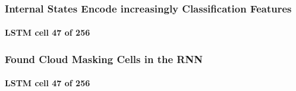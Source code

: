 
\begin{frame}
\frametitle{Internal States Encode increasingly Classification Features}
\framesubtitle{LSTM cell \textbf{47} of 256}
\end{frame}
%

\begin{frame}
\frametitle{Found Cloud Masking Cells in the RNN}
\framesubtitle{LSTM cell \textbf{47} of 256}
\end{frame}
%
%	
%
%	


